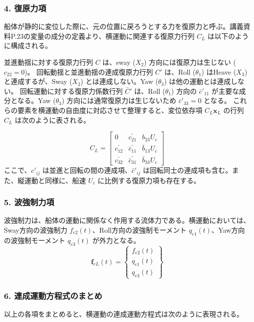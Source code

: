 \documentclass{article}
\begin{document}
\subsubsection*{4. 復原力項}
船体が静的に変位した際に、元の位置に戻ろうとする力を復原力と呼ぶ。講義資料P.23の変量の成分の定義より、横運動に関連する復原力行列 $C_L$ は以下のように構成される。

並進動揺に対する復原力行列 $C$ は、sway ($X_2$) 方向には復原力は生じない ($c_{22}=0$)。
回転動揺と並進動揺の連成復原力行列 $C'$ は、Roll ($\theta_1$) はHeave ($X_3$) と連成するが、Sway ($X_2$) とは連成しない。Yaw ($\theta_3$) は他の運動とは連成しない。
回転運動に対する復原力係数行列 $\bar{C}'$ は、Roll ($\theta_1$) 方向の $\bar{c}'_{11}$ が主要な成分となる。Yaw ($\theta_3$) 方向には通常復原力は生じないため $\bar{c}'_{33}=0$ となる。
これらの要素を横運動の自由度に対応させて整理すると、変位依存項 $C_L \mathbf{x}_L$ の行列 $C_L$ は次のように表される。

$$
C_L = \begin{bmatrix}
0 & c_{21}^{\prime} & b_{23} U_{c} \\
c_{12}^{\prime} & \bar{c}_{11}^{\prime} & \bar{b}_{13} U_{c} \\
c_{32}^{\prime} & \bar{c}_{31}^{\prime} & \bar{b}_{33} U_{c}
\end{bmatrix}
$$
ここで、$c'_{ij}$ は並進と回転の間の連成項、$\bar{c}'_{ij}$ は回転同士の連成項も含む。また、縦運動と同様に、船速 $U_c$ に比例する復原力項も存在する。

\subsubsection*{5. 波強制力項}
波強制力は、船体の運動に関係なく作用する流体力である。横運動においては、Sway方向の波強制力 $f_{e2}(t)$、Roll方向の波強制モーメント $q_{e1}(t)$、Yaw方向の波強制モーメント $q_{e3}(t)$ が外力となる。
$$\mathbf{f}_{eL}(t) = \begin{Bmatrix} f_{e2}(t) \\ q_{e1}(t) \\ q_{e3}(t) \end{Bmatrix}$$

\subsubsection*{6. 連成運動方程式のまとめ}
以上の各項をまとめると、横運動の連成運動方程式は次のように表現される。
\end{document}
